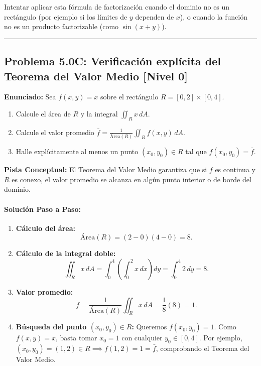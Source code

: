 \documentclass[11pt,a4paper]{article}
\begin{document}
\begin{trapbox}
Intentar aplicar esta fórmula de factorización cuando el dominio no es un rectángulo (por ejemplo si los límites de $y$ dependen de $x$), o cuando la función no es un producto factorizable (como $\sin(x+y)$).
\end{trapbox}

\vspace{0.5cm}
\hrule
\vspace{0.5cm}
\subsection*{Problema 5.0C: Verificación explícita del Teorema del Valor Medio \hfill \color{teal}\small[Nivel 0]}

\begin{tcolorbox}[colback=white,colframe=gray!40,arc=1mm,boxrule=0.5pt,left=3mm,right=3mm,top=2mm,bottom=2mm]
\textbf{Enunciado:} Sea $f(x,y) = x$ sobre el rectángulo $R = [0,2] \times [0,4]$.
\begin{enumerate}[label=\textbf{\alph*)}]
\item Calcule el área de $R$ y la integral $\iint_R x \, dA$.
\item Calcule el valor promedio $\bar{f} = \frac{1}{\text{Área}(R)} \iint_R f(x,y) \, dA$.
\item Halle explícitamente al menos un punto $(x_0, y_0) \in R$ tal que $f(x_0, y_0) = \bar{f}$.
\end{enumerate}
\end{tcolorbox}

\begin{tcolorbox}[colback=yellow!4,colframe=accentamber!70,arc=1mm,boxrule=0.5pt,left=3mm,right=3mm,top=1.5mm,bottom=1.5mm]
\textbf{Pista Conceptual:} El Teorema del Valor Medio garantiza que si $f$ es continua y $R$ es conexo, el valor promedio se alcanza en algún punto interior o de borde del dominio.
\end{tcolorbox}

\paragraph{Solución Paso a Paso:}\par
\begin{enumerate}[label=\textbf{\arabic*.}]
\item \textbf{Cálculo del área:}
\[ \text{Área}(R) = (2 - 0)(4 - 0) = 8. \]
\item \textbf{Cálculo de la integral doble:}
\[ \iint_R x \, dA = \int_0^4 \left( \int_0^2 x \, dx \right) dy = \int_0^4 2 \, dy = 8. \]
\item \textbf{Valor promedio:}
\[ \bar{f} = \frac{1}{\text{Área}(R)} \iint_R x \, dA = \frac{1}{8}(8) = 1. \]
\item \textbf{Búsqueda del punto $(x_0, y_0) \in R$:}
Queremos $f(x_0, y_0) = 1$. Como $f(x,y) = x$, basta tomar $x_0 = 1$ con cualquier $y_0 \in [0,4]$. Por ejemplo, $(x_0, y_0) = (1, 2) \in R \implies f(1,2) = 1 = \bar{f}$, comprobando el Teorema del Valor Medio.
\end{enumerate}
\end{document}
